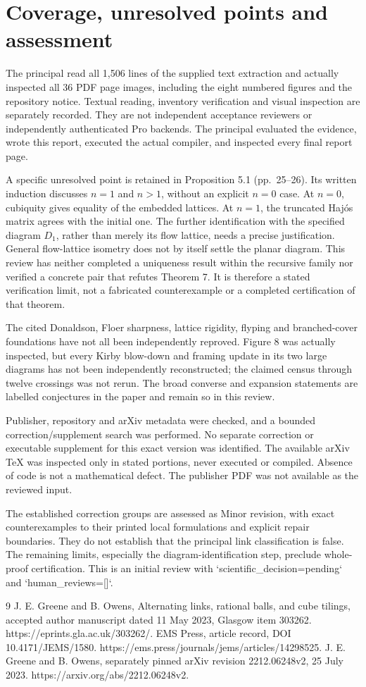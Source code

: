 \documentclass[10pt]{article}
\begin{document}
\section*{Coverage, unresolved points and assessment}
The principal read all 1,506 lines of the supplied text extraction and actually inspected all 36 PDF page images, including the eight numbered figures and the repository notice. Textual reading, inventory verification and visual inspection are separately recorded. They are not independent acceptance reviewers or independently authenticated Pro backends. The principal evaluated the evidence, wrote this report, executed the actual compiler, and inspected every final report page.\par
A specific unresolved point is retained in Proposition 5.1 (pp. 25–26). Its written induction discusses \(n=1\) and \(n>1\), without an explicit \(n=0\) case. At \(n=0\), cubiquity gives equality of the embedded lattices. At \(n=1\), the truncated Hajós matrix agrees with the initial one. The further identification with the specified diagram \(D_1\), rather than merely its flow lattice, needs a precise justification. General flow-lattice isometry does not by itself settle the planar diagram. This review has neither completed a uniqueness result within the recursive family nor verified a concrete pair that refutes Theorem 7. It is therefore a stated verification limit, not a fabricated counterexample or a completed certification of that theorem.\par
The cited Donaldson, Floer sharpness, lattice rigidity, flyping and branched-cover foundations have not all been independently reproved. Figure 8 was actually inspected, but every Kirby blow-down and framing update in its two large diagrams has not been independently reconstructed; the claimed census through twelve crossings was not rerun. The broad converse and expansion statements are labelled conjectures in the paper and remain so in this review.\par
Publisher, repository and arXiv metadata were checked, and a bounded correction/supplement search was performed. No separate correction or executable supplement for this exact version was identified. The available arXiv TeX was inspected only in stated portions, never executed or compiled. Absence of code is not a mathematical defect. The publisher PDF was not available as the reviewed input.\par
The established correction groups are assessed as Minor revision, with exact counterexamples to their printed local formulations and explicit repair boundaries. They do not establish that the principal link classification is false. The remaining limits, especially the diagram-identification step, preclude whole-proof certification. This is an initial review with `scientific\_decision=pending` and `human\_reviews=[]`.\par
9 J. E. Greene and B. Owens, Alternating links, rational balls, and cube tilings, accepted author manuscript dated 11 May 2023, Glasgow item 303262. https://eprints.gla.ac.uk/303262/. EMS Press, article record, DOI 10.4171/JEMS/1580. https://ems.press/journals/jems/articles/14298525. J. E. Greene and B. Owens, separately pinned arXiv revision 2212.06248v2, 25 July 2023. https://arxiv.org/abs/2212.06248v2.\par
\end{document}
